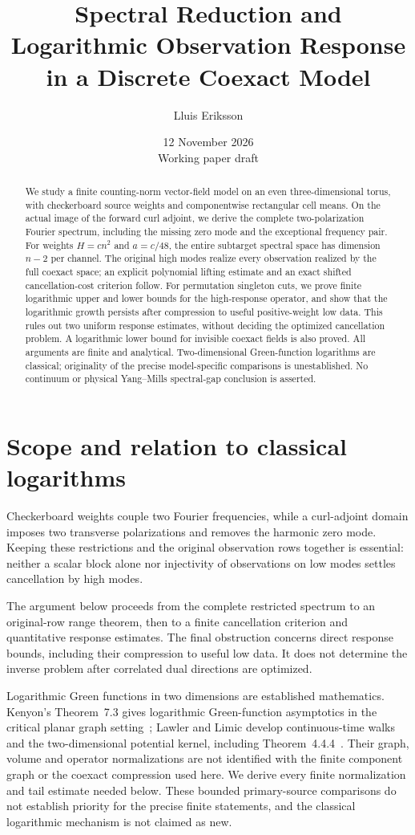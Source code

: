 \documentclass[11pt]{article}
\title{Spectral Reduction and Logarithmic Observation Response\\
in a Discrete Coexact Model}
\author{Lluis Eriksson}
\date{12 November 2026\\\small Working paper draft}
\theoremstyle{definition}
\theoremstyle{remark}
\begin{document}
\maketitle
\begin{abstract}
We study a finite counting-norm vector-field model on an even three-dimensional
torus, with checkerboard source weights and componentwise rectangular cell
means. On the actual image of the forward curl adjoint, we derive the complete
two-polarization Fourier spectrum, including the missing zero mode and the
exceptional frequency pair. For weights $H=cn^2$ and $a=c/48$, the entire
subtarget spectral space has dimension $n-2$ per channel. The original high
modes realize every observation realized by the full coexact space; an
explicit polynomial lifting estimate and an exact shifted cancellation-cost
criterion follow. For permutation singleton cuts, we prove finite logarithmic
upper and lower bounds for the high-response operator, and show that the
logarithmic growth persists after compression to useful positive-weight low
data. This rules out two uniform response estimates, without deciding the
optimized cancellation problem. A logarithmic lower bound for invisible
coexact fields is also proved. All arguments are finite and analytical.
Two-dimensional Green-function logarithms are classical; originality of the
precise model-specific comparisons is unestablished. No continuum or physical
Yang--Mills spectral-gap conclusion is asserted.
\end{abstract}

\section{Scope and relation to classical logarithms}
Checkerboard weights couple two Fourier frequencies, while a curl-adjoint
domain imposes two transverse polarizations and removes the harmonic zero
mode. Keeping these restrictions and the original observation rows together
is essential: neither a scalar block alone nor injectivity of observations
on low modes settles cancellation by high modes.

The argument below proceeds from the complete restricted spectrum to an
original-row range theorem, then to a finite cancellation criterion and
quantitative response estimates. The final obstruction concerns direct
response bounds, including their compression to useful low data. It does
not determine the inverse problem after correlated dual directions are
optimized.

Logarithmic Green functions in two dimensions are established mathematics.
Kenyon's Theorem~7.3 gives logarithmic Green-function asymptotics in the
critical planar graph setting~\cite{Kenyon}; Lawler and Limic develop
continuous-time walks and the two-dimensional potential kernel, including
Theorem~4.4.4~\cite{LawlerLimic}. Their graph, volume and operator
normalizations are not identified with the finite component graph or the
coexact compression used here. We derive every finite normalization and
tail estimate needed below. These bounded primary-source comparisons do
not establish priority for the precise finite statements, and the classical
logarithmic mechanism is not claimed as new.
\end{document}
